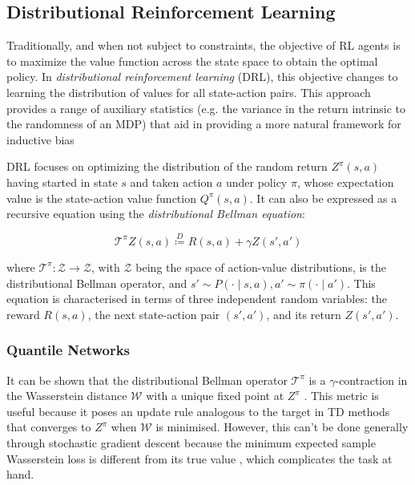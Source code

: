 \documentclass[12pt,twoside]{report}
\begin{document}
\subsection{Distributional Reinforcement Learning}

Traditionally, and when not subject to constraints, the objective of RL agents is to maximize the value function across the state space to obtain the optimal policy. In \textit{distributional reinforcement learning} \cite{distributional-perspective} (DRL), this objective changes to learning the distribution of values for all state-action pairs. This approach provides a range of auxiliary statistics (e.g. the variance in the return intrinsic to the randomness of an MDP) that aid in providing a more natural framework for inductive bias

\smallskip

DRL focuses on optimizing the distribution of the random return $Z^\pi \! \left(s,a\right)$ having started in state $s$ and taken action $a$ under policy $\pi$, whose expectation value is the state-action value function $Q^\pi \! \left(s,a\right)$. It can also be expressed as a recursive equation using the \textit{distributional Bellman equation}: 

\begin{equation}
    \mathcal{T}^\pi Z(s,a) \stackrel{D}{\coloneqq} R(s,a) + \gamma Z(s',a')
\end{equation}

\noindent where $\mathcal{T}^\pi : \mathcal{Z} \longrightarrow \mathcal{Z}$, with $\mathcal{Z}$ being the space of action-value distributions, is the distributional Bellman operator, and $s' \sim P(\cdot \! \mid \! s,a), a' \sim \pi(\cdot \! \mid \! a')$. This equation is characterised in terms of three independent random variables: the reward $R(s,a)$, the next state-action pair $(s',a')$, and its return $Z(s',a')$. 

\subsubsection{Quantile Networks}

It can be shown that the distributional Bellman operator $\mathcal{T}^\pi$ is a $\gamma$-contraction in the Wasserstein distance $\mathcal{W}$ with a unique fixed point at $Z^\pi$  \cite{distributional-perspective}. This metric is useful because it poses an update rule analogous to the target in TD methods that converges to $Z^\pi$ when $\mathcal{W}$ is minimised. However, this can't be done generally through stochastic gradient descent because the minimum expected sample Wasserstein loss is different from its true value \cite{quantile-regression}, which complicates the task at hand. 
\end{document}

